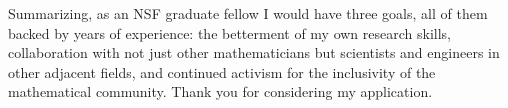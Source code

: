 \documentclass[11pt]{article}
\begin{document}
Summarizing, as an NSF graduate fellow I would have three goals, all of them backed by years of experience: the betterment of my own research skills, collaboration with not just other mathematicians but scientists and engineers in other adjacent fields, and continued activism for the inclusivity of the mathematical community.
Thank you for considering my application.


%
%
\footnotesize
\printbibliography
\end{document}
